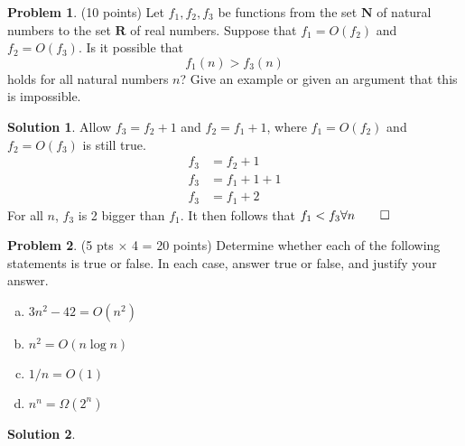 \documentclass{article}
\theoremstyle{definition}
\newtheorem{problem}{Problem}
\newtheorem*{solution}{Solution}
\newcommand{\N}{\mathbf{N}}
\newcommand{\R}{\mathbf{R}}
\begin{document}
\begin{problem} (10 points) 
Let $f_1, f_2, f_3$ be functions from the set $\N$ of natural numbers
to the set $\R$ of real numbers. Suppose that $f_1= O(f_2)$ and
$f_2=O(f_3)$. Is it possible that 
$$ f_1(n) > f_3(n)$$ 
holds for all natural numbers $n$? Give an example or given an argument that this
is impossible. 
\end{problem}
\begin{solution}
Allow $f_3 = f_2 +1$ and $f_2 = f_1 +1$, where $f_1 = O(f_2)$ and $f_2 = O(f_3)$ is still true.
\begin{align*}
  f_3 &= f_2 +1 \\
  f_3 &= f_1 + 1 + 1 \\
  f_3 &= f_1 +2
\end{align*}
For all $n$, $f_3$ is 2 bigger than $f_1$. It then follows that $f_1 < f_3 \forall n \qed$
\end{solution}

\begin{problem} (5 pts $\times$ 4 = 20 points) 
Determine whether each of the following statements is true or false.
In each case, answer true or false, and justify your answer.
\begin{enumerate}[a)]
\item $3n^2-42 = O(n^2)$
\item $n^2 = O(n\log n)$
\item $1/n = O(1)$
\item $n^n = \Omega(2^n)$
\end{enumerate}
\end{problem}
\begin{solution}
\end{solution}
\end{document}
